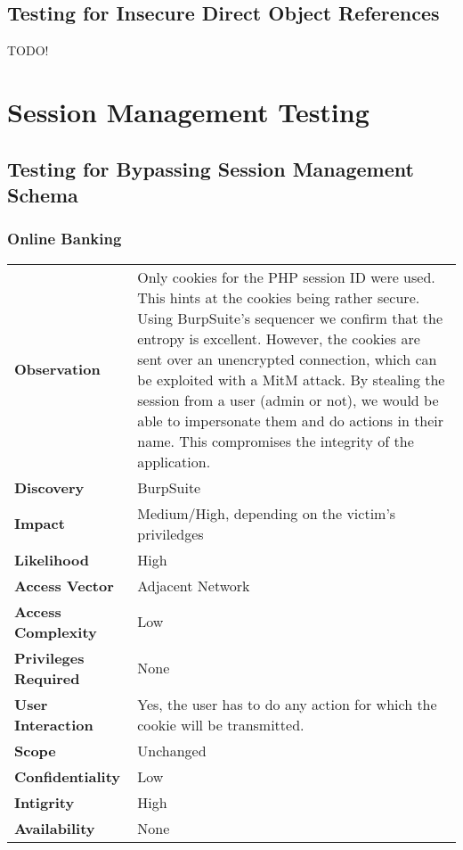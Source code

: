 \subsection{Testing for Insecure Direct Object References}
TODO!









\section{Session Management Testing}

\subsection{Testing for Bypassing Session Management Schema}

\subsubsection*{Online Banking}

\begin{tabular}{l|p{10cm}}
\textbf{Observation} & Only cookies for the PHP session ID were used. This hints at the cookies being rather secure. Using BurpSuite's sequencer we confirm that the entropy is excellent. However, the cookies are sent over an unencrypted connection, which can be exploited with a MitM attack. By stealing the session from a user (admin or not), we would be able to impersonate them and do actions in their name. This compromises the integrity of the application. \\
\textbf{Discovery} & BurpSuite \\
\textbf{Impact} &Medium/High, depending on the victim's priviledges \\
\textbf{Likelihood} & High \\
\textbf{Access Vector} & Adjacent Network \\
\textbf{Access Complexity} & Low\\
\textbf{Privileges Required} & None \\
\textbf{User Interaction} & Yes, the user has to do any action for which the cookie will be transmitted. \\
\textbf{Scope} & Unchanged \\
\textbf{Confidentiality} & Low \\
\textbf{Intigrity} & High\\
\textbf{Availability} & None \\
\end{tabular}

